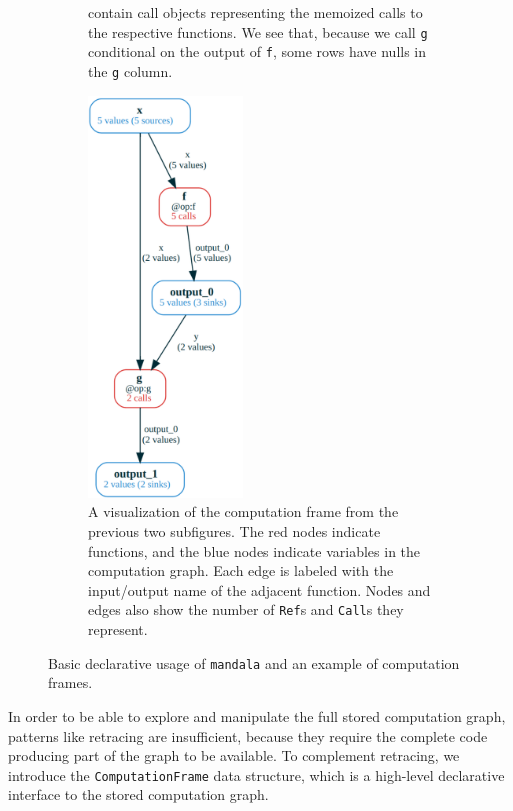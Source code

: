 \begin{figure}[htbp]
\begin{subfigure}[b]{\textwidth}
{        contain call objects representing the memoized calls to the
        respective functions. We see that, because we call \texttt{g}
        conditional on the output of \texttt{f}, some rows have nulls in the
        \texttt{g} column.}
        \label{fig:figure2}
    \end{subfigure}
    \begin{subfigure}[b]{\textwidth}
        \centering
        \includegraphics[width=0.45\textwidth]{img/cf.pdf}
        \caption{A visualization of the computation frame from the previous
        two subfigures. The red nodes indicate functions, and the blue nodes
        indicate variables in the computation graph. Each edge is labeled
        with the input/output name of the adjacent function. Nodes and edges
        also show the number of \texttt{Ref}s and \texttt{Call}s they
        represent.}
        \label{fig:figure3}
    \end{subfigure}
    \caption{Basic declarative usage of \texttt{mandala} and an example of
computation frames.}
    \label{fig:cf}
\end{figure}

In order to be able to explore and manipulate the full stored computation graph,
patterns like retracing are insufficient, because they require the complete code
producing part of the graph to be available. To complement retracing, we
introduce the \texttt{ComputationFrame} data structure, which is a high-level
declarative interface to the stored computation graph.

